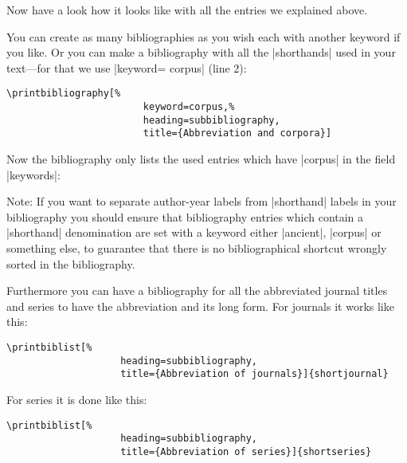 \documentclass[a4paper,
10pt,
greek,
french,
spanish,
italian,
ngerman,
english
]{ltxdoc}
\begin{document}
\begin{refsection}
\nocite{*}
Now have a look how it looks like with all the entries we explained above.
\begin{bsp}
\renewcommand\bibfont{\normalfont\footnotesize}
\printbibheading[%
							heading=bibliography,%
							title={Bibliography}] %

\printbibliography[%
							keyword=ancient,%
							heading=subbibliography,
							title={Ancient authors and works}]

\printbibliography[%
							notkeyword=ancient,%
							notkeyword=corpus,%
							heading=subbibliography,
							title={Secondary literature}]
\end{bsp}

You can create as many bibliographies as you wish each with another keyword if you like.
Or you can make a bibliography with all the |shorthands| used in your text---for that we use |keyword= {corpus}| (line 2):
\begin{lstlisting}
\printbibliography[%
						keyword=corpus,%
						heading=subbibliography,
					 	title={Abbreviation and corpora}]
\end{lstlisting}
Now the bibliography only lists the used entries which have |corpus| in the field |keywords|:
\begin{bsp}
\printbibliography[%
						keyword={corpus},
          				heading=subbibliography,
            			title={Abbreviation of corpora}]\label{bib:corpus}
\end{bsp}

Note: If you want to separate author-year labels from |shorthand| labels in your bibliography 
 you should ensure that bibliography entries which contain a |shorthand| denomination 
are set with a keyword either |ancient|, |corpus| or something else, to guarantee that there is 
no bibliographical shortcut wrongly sorted in the bibliography.

Furthermore you can have a bibliography for all the abbreviated journal titles and series to have the abbreviation and its long form.
For journals it works like this:
\begin{lstlisting}
\printbiblist[%
					heading=subbibliography,
					title={Abbreviation of journals}]{shortjournal}
\end{lstlisting}

\begin{bsp}
\end{bsp}

For series it is done like this:
\begin{lstlisting}
\printbiblist[%
					heading=subbibliography,
					title={Abbreviation of series}]{shortseries}
\end{lstlisting}


\begin{bsp}
\end{bsp}

\end{refsection}
\end{document}

